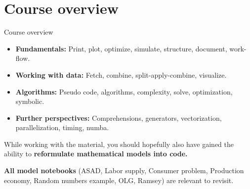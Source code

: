 \documentclass[10pt,english,t,aspectratio=169]{beamer}
\begin{document}
\section{Course overview}
\begin{frame}{Course overview}
\begin{itemize}
    \item \textbf{Fundamentals:} Print, plot, optimize, simulate, structure, document, work-flow.  \par 
    \item \textbf{Working with data:} Fetch, combine, split-apply-combine, visualize.
    \item \textbf{Algorithms:} Pseudo code, algorithms, complexity, solve, optimization, symbolic.
    \item \textbf{Further perspectives:} Comprehensions, generators, vectorization, parallelization, timing, numba.
\end{itemize}
    \vfill 
    While working with the material, you should hopefully also have gained the ability to \textbf{reformulate mathematical models into code.} \par 
    \textbf{All model notebooks} (ASAD, Labor supply, Consumer problem, Production economy,  Random numbers example, OLG, Ramsey) are relevant to revisit.
\end{frame}
\end{document}
